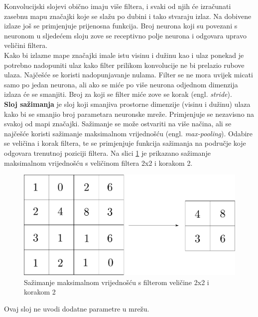 \documentclass[times, utf8, zavrsni, numeric]{fer}
\begin{document}
Konvolucijski slojevi obično imaju više filtera, i svaki od njih će 
izračunati zasebnu mapu značajki koje se slažu po dubini i tako stvaraju
izlaz. Na dobivene izlaze još se primjenjuje prijenosna funkcija. Broj
neurona koji su povezani s neuronom u sljedećem sloju
zove se receptivno polje neurona i odgovara upravo veličini filtera.
\\\indent Kako bi izlazne mape značajki imale istu visinu i dužinu kao i ulaz
ponekad je potrebno nadopuniti ulaz kako filter prilikom konvolucije ne bi
prelazio rubove ulaza. Najčešće se koristi nadopunjavanje nulama. Filter
se ne mora uvijek micati samo po jedan neurona, ali ako se miće po više 
neurona odjednom dimenzija izlaza će se smanjiti. Broj za koji se filter
miće zove se korak (engl. \textit{stride}).
\\\indent \textbf{Sloj sažimanja} je sloj koji smanjiva prostorne dimenzije 
(visinu i dužinu) ulaza kako bi se smanjio broj parametara neuronske mreže.
Primjenjuje se nezavisno na svakoj od mapi značajki. Sažimanje se može
ostvariti na više načina, ali se najčešće koristi sažimanje maksimalnom 
vrijednošću (engl. \textit{max-pooling}). Odabire se veličina i korak filtera,
te se primjenjuje funkcija sažimanja na područje koje odgovara trenutnoj
poziciji filtera. Na slici \ref{fig:max_pool} je prikazano sažimanje 
maksimalnom vrijednošću s veličinom filtera 2x2 i korakom 2.
\begin{figure}[htb]
	\centering
	\includegraphics[scale=0.40]{max_pool.pdf}
	\caption{Sažimanje maksimalnom vrijednošću s filterom veličine 2x2 i korakom 2}
	\label{fig:max_pool}
\end{figure}
Ovaj sloj ne uvodi dodatne parametre u mrežu.
\end{document}
